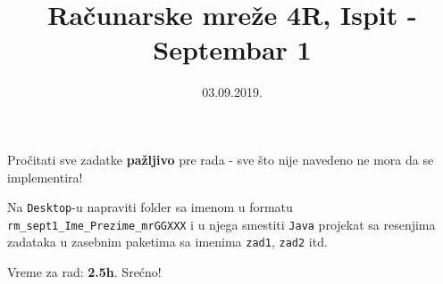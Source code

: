\documentclass[]{article}
\title{Ra\v{c}unarske mre\v{z}e 4R, Ispit - Septembar 1}
\date{03.09.2019.}
\begin{document}
\makeatletter
\begin{center}

{\fontsize{12pt}{14pt}\selectfont\bfseries\@title\par}
\@date
\vspace{5mm}

Pro\v{c}itati sve zadatke \textbf{pa\v{z}ljivo} pre rada - sve \v{s}to nije navedeno ne mora da se implementira! 

Na \texttt{Desktop}-u napraviti folder sa imenom u formatu \texttt{rm\_sept1\_Ime\_Prezime\_mrGGXXX} i u njega smestiti \texttt{Java} projekat sa resenjima zadataka u zasebnim paketima sa imenima \texttt{zad1}, \texttt{zad2} itd. 

Vreme za rad: \textbf{2.5h}. Sre\'{c}no!
\end{center}
\makeatother
\end{document}
